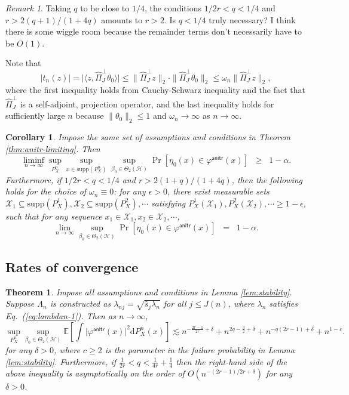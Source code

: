 \documentclass[11pt,a4paper]{article}
\renewcommand{\hat}{\widehat}
\theoremstyle{definition}
\theoremstyle{plain}
\newtheorem{theorem}{Theorem}[section]
\newtheorem{corollary}{Corollary}[section]
\theoremstyle{remark}
\newtheorem{remark}{Remark}[section]
\newcommand{\supp}{\mathrm{supp}}
\newcommand{\mX}{\mathcal X}
\newcommand{\ud}{\mathrm d}
\newcommand{\mH}{\mathcal H}
\newcommand{\anitr}{\mathsf{anitr}}
\begin{document}
\begin{remark}
Taking $q$ to be close to $1/4$, the conditions $1/2r<q<1/4$ and $r>2(q+1)/(1+4q)$ amounts to $r>2$.
{\color{red}Is $q<1/4$ truly necessary? I think there is some wiggle room because the remainder terms don't necessarily have to be $O(1)$.}
\end{remark}

Note that 
\begin{equation}
\big|t_n(z)\big| = \big|\langle z, \hat\Pi_J^\perp\theta_0\rangle\big| \leq \|\hat\Pi_J^\perp z\|_2\cdot \|\hat\Pi_J^\perp\theta_0\|_2 \leq \omega_n\|\hat\Pi_J^\perp z\|_2,
\label{eq:anitr-limiting-impl}
\end{equation}
where the first inequality holds from Cauchy-Schwarz inequality and the fact that $\hat\Pi_J^\perp$ is a self-adjoint, projection operator, and the 
last inequality holds for sufficiently large $n$ because $\|\theta_0\|_2\leq 1$ and $\omega_n\to\infty$ as $n\to\infty$.

\begin{corollary}
Impose the same set of assumptions and conditions in Theorem \ref{thm:anitr-limiting}. Then
$$
\liminf_{n\to\infty}\sup_{P_X^n}\sup_{x\in\supp(P_X^n)}\sup_{\beta_0\in\Theta_2(\mH)}\Pr[\eta_0(x)\in\varphi^\anitr(x)] \;\;\geq\;\; 1-\alpha.
$$
Furthermore, if $1/2r<q<1/4$ and $r>2(1+q)/(1+4q)$, then the following holds for the choice of $\omega_n\equiv 0$:
for any $\epsilon>0$, there exist measurable sets $\mX_1\subseteq\supp(P_X^1),\mX_2\subseteq\supp(P_X^2),\cdots$ satisfying $P_X^1(\mX_1),P_X^2(\mX_2),\cdots\geq 1-\epsilon$,
such that for any sequence $x_1\in\mX_1,x_2\in\mX_2,\cdots$, 
$$
\lim_{n\to\infty}\sup_{\beta_0\in\Theta_2(\mH)} \Pr[\eta_0(x)\in\varphi^\anitr(x)] \;\; = \;\; 1-\alpha.
$$
\label{cor:anitr}
\end{corollary}

\subsection{Rates of convergence}

\begin{theorem}
Impose all assumptions and conditions in Lemma \ref{lem:stability}. Suppose $\Lambda_n$ is constructed as $\lambda_{nj}=\sqrt{\hat s_j\lambda_n}$ for all $j\leq J(n)$,
where $\lambda_n$ satisfies Eq.~(\ref{eq:lambdan-1}). Then as $n\to\infty$, 
$$
\sup_{P_X^n}\sup_{\beta_0\in\Theta_2(\mH)}\mathbb E\left[\int \big|\varphi^\anitr(x)\big|^2\ud P_X^n(x) \right] \lesssim n^{-\frac{2r-1}{2r}+\delta} + n^{2q-\frac{3}{2}+\delta} + n^{-q(2r-1)+\delta} + n^{1-c}.
$$
for any $\delta>0$, where $c\geq 2$ is the parameter in the failure probability in Lemma \ref{lem:stability}.
Furthermore, if $\frac{1}{2r}<q<\frac{1}{4r}+\frac{1}{4}$ then the right-hand side of the above inequality is asymptotically on the order of $O(n^{-(2r-1)/2r+\delta})$ for any $\delta>0$.
\label{thm:anitr-rates}
\end{theorem}
\end{document}
